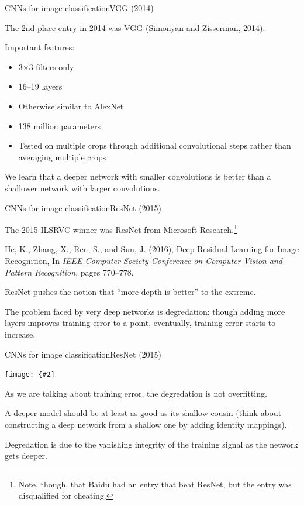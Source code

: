 \documentclass{beamer}
\newcommand{\myfig}[3]{\centerline{\texttt{[image: \{\#2]}}}
\begin{document}
\begin{frame}{CNNs for image classification}{VGG (2014)}

  The 2nd place entry in 2014 was VGG (Simonyan and Zisserman, 2014).

  \medskip

  Important features:
  \begin{itemize}
  \item 3$\times$3 filters only
  \item 16--19 layers
  \item Otherwise similar to AlexNet
  \item 138 million parameters
  \item Tested on multiple crops through additional convolutional steps
    rather than averaging multiple crops
  \end{itemize}

  \medskip

  We learn that a deeper network with smaller convolutions is better
  than a shallower network with larger convolutions.

\end{frame}


\begin{frame}{CNNs for image classification}{ResNet (2015)}

  The 2015 ILSRVC winner was \alert{ResNet} from Microsoft
  Research.\footnote{Note, though, that Baidu had an entry that beat ResNet,
  but the entry was disqualified for cheating.}

  \medskip

  He, K., Zhang, X., Ren, S., and Sun, J. (2016), Deep Residual
  Learning for Image Recognition, In \textit{IEEE Computer Society
    Conference on Computer Vision and Pattern Recognition}, pages
  770--778.

  \medskip

  ResNet pushes the notion that ``more depth is better'' to the extreme.

  \medskip

  The problem faced by very deep networks is \alert{degredation}:
  though adding more layers improves training error to a point,
  eventually, training error starts to \alert{increase}.

\end{frame}


\begin{frame}{CNNs for image classification}{ResNet (2015)}

  \myfig{3.8in}{he-fig1}{He et al.\ (2016), Fig.\ 1}

  \medskip

  As we are talking about training error, the degredation is
  \alert{not overfitting}.

  \medskip

  A deeper model should be at least as good as its shallow cousin
  (think about constructing a deep network from a shallow one by
  adding identity mappings).

  \medskip
  
  Degredation is due to the vanishing integrity of the training signal
  as the network gets deeper.

\end{frame}
\end{document}
